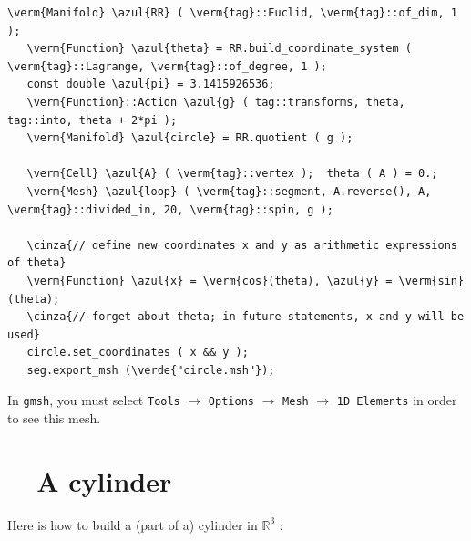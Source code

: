\begin{Verbatim}[commandchars=\\\{\},formatcom=\small\tt,frame=single,
   label=parag-\ref{\numb section 7.\numb parag 2}.cpp,rulecolor=\color{coment},
   baselinestretch=0.94,framesep=2mm                                            ]
   \verm{Manifold} \azul{RR} ( \verm{tag}::Euclid, \verm{tag}::of_dim, 1 );
   \verm{Function} \azul{theta} = RR.build_coordinate_system ( \verm{tag}::Lagrange, \verm{tag}::of_degree, 1 );
   const double \azul{pi} = 3.1415926536;
   \verm{Function}::Action \azul{g} ( tag::transforms, theta, tag::into, theta + 2*pi );
   \verm{Manifold} \azul{circle} = RR.quotient ( g );

   \verm{Cell} \azul{A} ( \verm{tag}::vertex );  theta ( A ) = 0.;
   \verm{Mesh} \azul{loop} ( \verm{tag}::segment, A.reverse(), A, \verm{tag}::divided_in, 20, \verm{tag}::spin, g );

   \cinza{// define new coordinates x and y as arithmetic expressions of theta}
   \verm{Function} \azul{x} = \verm{cos}(theta), \azul{y} = \verm{sin}(theta);
   \cinza{// forget about theta; in future statements, x and y will be used}
   circle.set_coordinates ( x && y );
   seg.export_msh (\verde{"circle.msh"});
\end{Verbatim}

In {\tt gmsh}, you must select {\small\tt Tools} $\to$ {\small\tt Options} $\to$
{\small\tt Mesh} $\to$ {\small\tt 1D Elements} in order to see this mesh.


\section{~~A cylinder}\label{\numb section 7.\numb parag 3}

Here is how to build a (part of a) cylinder in $ \mathbb{R}^3 $ :

